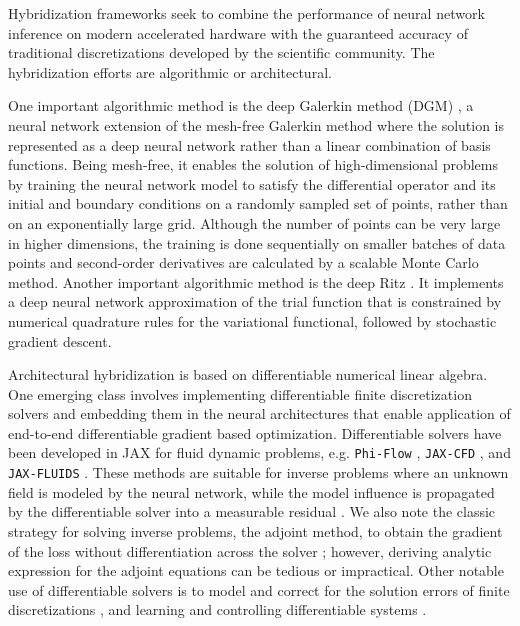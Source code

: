 \documentclass{article}
\begin{document}
Hybridization frameworks seek to combine the performance of neural network inference on modern accelerated hardware with the guaranteed accuracy of traditional discretizations developed by the scientific community. The hybridization efforts are algorithmic or architectural.

One important algorithmic method is the deep Galerkin method (DGM) \cite{SIRIGNANO20181339}, a neural network extension of the mesh-free Galerkin method where the solution is represented as a deep neural network rather than a linear combination of basis functions. Being mesh-free, it enables the solution of high-dimensional problems by training the neural network model to satisfy the differential operator and its initial and boundary conditions on a randomly sampled set of points, rather than on an exponentially large grid. Although the number of points can be very large in higher dimensions, the training is done sequentially on smaller batches of data points and second-order derivatives are calculated by a scalable Monte Carlo method. Another important algorithmic method is the deep Ritz \cite{yu2018deep}. It implements a deep neural network approximation of the trial function that is constrained by numerical quadrature rules for the variational functional, followed by stochastic gradient descent.

Architectural hybridization is based on differentiable numerical linear algebra. One emerging class involves implementing differentiable finite discretization solvers and embedding them in the neural architectures that enable application of end-to-end differentiable gradient based optimization. Differentiable solvers have been developed in JAX \cite{jax2018github} for fluid dynamic problems, e.g. \texttt{Phi-Flow} \cite{holl2020phiflow}, \texttt{JAX-CFD} \cite{Kochkov2021-ML-CFD}, and \texttt{JAX-FLUIDS} \cite{bezgin2022jax}. These methods are suitable for inverse problems where an unknown field is modeled by the neural network, while the model influence is propagated by the differentiable solver into a measurable residual \cite{pakravan2021solving, dal2020data, lu2020extracting}. We also note the classic strategy for solving inverse problems, the adjoint method, to obtain the gradient of the loss without differentiation across the solver \cite{berg2017neural}; however, deriving analytic expression for the adjoint equations can be tedious or impractical. Other notable use of differentiable solvers is to model and correct for the solution errors of finite discretizations \cite{um2020solver}, and learning and controlling differentiable systems \cite{de2018end, holl2020learning}.
\end{document}
